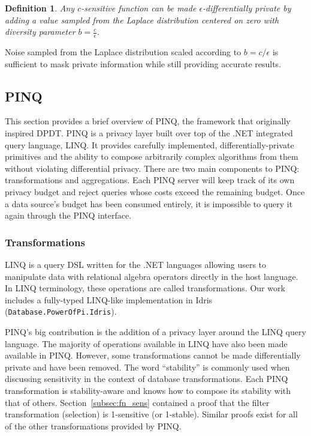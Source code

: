 \documentclass[12pt]{article}
\newtheorem{defn}{Definition}[section]
\begin{document}
\begin{defn}
Any $c$-sensitive function can be made $\epsilon$-differentially private by adding a value sampled from the Laplace distribution centered on zero with diversity parameter $b=\frac{c}{\epsilon}$.
\end{defn}

Noise sampled from the Laplace distribution scaled according to $b=c/\epsilon$ is sufficient to mask private information while still providing accurate results.

\subsection{PINQ}\label{sec:pinq}

This section provides a brief overview of PINQ, the framework that originally inspired DPDT.
PINQ is a privacy layer built over top of the .NET integrated query language, LINQ.
It provides carefully implemented, differentially-private primitives and the ability to compose arbitrarily complex algorithms from them without violating differential privacy.
There are two main components to PINQ: transformations and aggregations.
Each PINQ server will keep track of its own privacy budget and reject queries whose costs exceed the remaining budget.
Once a data source's budget has been consumed entirely, it is impossible to query it again through the PINQ interface.

\subsubsection{Transformations}

LINQ is a query DSL written for the .NET languages allowing users to manipulate data with relational algebra operators directly in the host language.
In LINQ terminology, these operations are called transformations.
Our work includes a fully-typed LINQ-like implementation in Idris (\texttt{Database.PowerOfPi.Idris}).

PINQ's big contribution is the addition of a privacy layer around the LINQ query language.
The majority of operations available in LINQ have also been made available in PINQ.
However, some transformations cannot be made differentially private and have been removed.
The word ``stability'' is commonly used when discussing sensitivity in the context of database transformations.
Each PINQ transformation is stability-aware and knows how to compose its stability with that of others.
Section~\ref{subsec:fn_sens} contained a proof that the filter transformation (selection) is 1-sensitive (or 1-stable).
Similar proofs exist for all of the other transformations provided by PINQ\cite{conf/sigmod/McSherry09}.
\end{document}
